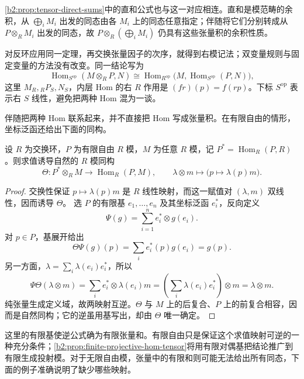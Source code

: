 \ProseParagraphBreak
\cref{b2:prop:tensor-direct-sums}中的直和公式也与这一对应相连。直和是模范畴的余积，从 \(\bigoplus_iM_i\) 出发的同态由各 \(M_i\) 上的同态任意指定；伴随将它们分别转成从 \(P\otimes_RM_i\) 出发的同态，故 \(P\otimes_R(\bigoplus_iM_i)\) 仍具有这些张量积的余积性质。

\ProseParagraphBreak
对反环应用同一定理，再交换张量因子的次序，就得到右模记法；双变量规则与固定变量的方法没有改变。同一结论写为
\[
	\operatorname{Hom}_{S^{\mathrm{op}}}(M\otimes_RP,N) \cong\operatorname{Hom}_{R^{\mathrm{op}}} \bigl(M,\operatorname{Hom}_{S^{\mathrm{op}}}(P,N)\bigr),
\]
这里 \(M_R,{}_RP_S,N_S\)，内层 Hom 的右 \(R\) 作用是 \((fr)(p)=f(rp)\)。下标 \(S^{\mathrm{op}}\) 表示右 \(S\) 线性，避免把两种 Hom 混为一谈。

\ProseParagraphBreak
伴随把两种 Hom 联系起来，并不直接把 Hom 写成张量积。在有限自由的情形，坐标泛函还给出下面的同构。

\begin{proposition}\label{b2:prop:finite-free-hom-tensor}
	设 \(R\) 为交换环，\(P\) 为有限自由 \(R\) 模，\(M\) 为任意 \(R\) 模，记 \(P^*=\operatorname{Hom}_R(P,R)\)。则求值诱导自然的 \(R\) 模同构
	\[
		\Theta:P^*\otimes_RM\longrightarrow\operatorname{Hom}_R(P,M), \qquad \lambda\otimes m\longmapsto\bigl(p\mapsto\lambda(p)m\bigr).
	\]
\end{proposition}
\begin{proof}
	交换性保证 \(p\mapsto\lambda(p)m\) 是 \(R\) 线性映射，而这一赋值对 \((\lambda,m)\) 双线性，因而诱导 \(\Theta\)。 选 \(P\) 的有限基 \(e_1,\ldots,e_n\) 及其坐标泛函 \(e_i^*\)，反向定义
	\[
		\Psi(g)=\sum_{i=1}^n e_i^*\otimes g(e_i).
	\]
	对 \(p\in P\)，基展开给出
	\[
		\Theta\Psi(g)(p)=\sum_i e_i^*(p)g(e_i)=g(p).
	\]
	另一方面，\(\lambda=\sum_i\lambda(e_i)e_i^*\)，所以
	\[
		\Psi\Theta(\lambda\otimes m) =\sum_i e_i^*\otimes\lambda(e_i)m =\left(\sum_i\lambda(e_i)e_i^*\right)\otimes m =\lambda\otimes m.
	\]
	纯张量生成定义域，故两映射互逆。\(\Theta\) 与 \(M\) 上的后复合、\(P\) 上的前复合相容，因而是自然同构；它的逆虽用基写出，却由 \(\Theta\) 唯一确定。
\end{proof}
这里的有限基使逆公式确为有限张量和。有限自由只是保证这个求值映射可逆的一种充分条件；\cref{b2:prop:finite-projective-hom-tensor}将用有限对偶基把结论推广到有限生成投射模。对于无限自由模，张量中的有限和则可能无法给出所有同态，下面的例子准确说明了缺少哪些映射。

